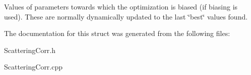 Values of parameters towards which the optimization is biased (if biasing is used). These are normally dynamically updated to the last \char`\"{}best\char`\"{} values found. 

The documentation for this struct was generated from the following files\+:\begin{DoxyCompactItemize}
\item 
Scattering\+Corr.\+h\item 
Scattering\+Corr.\+cpp\end{DoxyCompactItemize}
